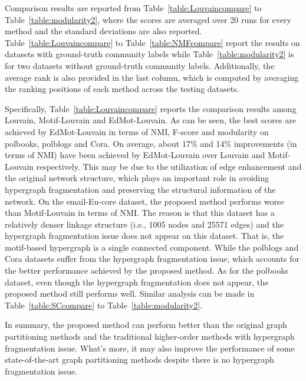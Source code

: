\documentclass[sigconf]{acmart}
\begin{document}
Comparison results are reported from Table~\ref{table:Louvaincompare} to Table~\ref{table:modularity2}, where the scores are averaged over 20 runs for every method and the standard deviations are also reported. Table~\ref{table:Louvaincompare} to Table~\ref{table:NMFcompare} report the results on datasets with ground-truth community labels while Table~\ref{table:modularity2} is for two datasets without ground-truth community labels. Additionally, the average rank is also provided in the last column, which is computed by averaging the ranking positions of each method across the testing datasets.

Specifically, Table~\ref{table:Louvaincompare} reports the comparison results among Louvain, Motif-Louvain and EdMot-Louvain. As can be seen, the best scores are achieved by EdMot-Louvain in terms of NMI, F-score and modularity on polbooks, polblogs and Cora. On average, about 17\% and 14\% improvements (in terms of NMI) have been achieved by EdMot-Louvain over Louvain and Motif-Louvain respectively. This may be due to the utilization of edge enhancement and the original network structure, which plays an important role in avoiding hypergraph fragmentation and preserving the structural information of the network.
On the email-Eu-core dataset, the proposed method performs worse than Motif-Louvain in terms of NMI. The reason is that this dataset has a relatively denser linkage structure (i.e., 1005 nodes and 25571 edges) and the hypergraph fragmentation issue does not appear on this dataset. That is, the motif-based hypergraph is a single connected component. While the polblogs and Cora datasets suffer from the hypergraph fragmentation issue, which accounts for the better performance achieved by the proposed method. As for the polbooks dataset, even though the hypergraph fragmentation does not appear, the proposed method still performs well. Similar analysis can be made in Table~\ref{table:SCcompare} to Table~\ref{table:modularity2}.

In summary, the proposed method can perform better than the original graph partitioning methods and the traditional higher-order methods with hypergraph fragmentation issue. What's more, it may also improve the performance of some state-of-the-art graph partitioning methods despite there is no hypergraph fragmentation issue.
\end{document}
